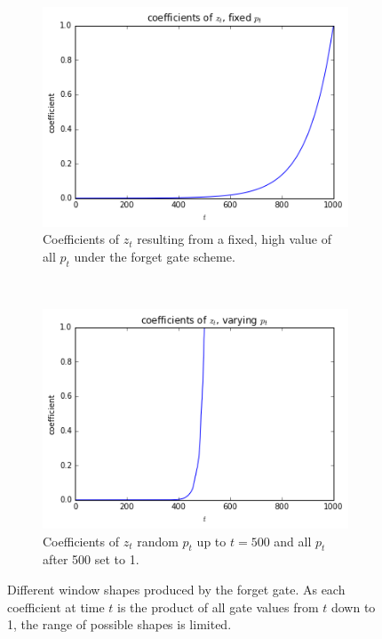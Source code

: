 \begin{figure}[t]
\centering
\begin{subfigure}[t]{0.45\textwidth}
	\centering
	\includegraphics[width=\textwidth]{newarchs/lstmexp}
	\caption{Coefficients of \(z_t\) resulting from a fixed, high value of all \(p_t\)
	under the forget gate scheme.}
\end{subfigure}~
\begin{subfigure}[t]{0.45\textwidth}
	\centering
	\includegraphics[width=\textwidth]{newarchs/lstmrect}
	\caption{Coefficients of \(z_t\) random \(p_t\) up to \(t=500\) and all \(p_t\) after
	500 set to 1.}
\end{subfigure}
\caption[Forget gate window shapes]
{Different window shapes produced by the forget gate. As each coefficient at time \(t\)
is the product of all gate values from \(t\) down to 1, the range of possible shapes is limited.}
\label{fig:lstmgates}
\end{figure}

